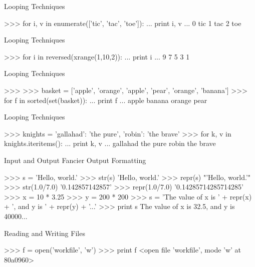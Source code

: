 \documentclass[11pt]{beamer}
\begin{document}
\begin{frame}[containsverbatim]{Looping Techniques}
\begin{python}
>>> for i, v in enumerate(['tic', 'tac', 'toe']):
...    print i, v
...
0 tic
1 tac
2 toe
\end{python}
\end{frame}

\begin{frame}[containsverbatim]{Looping Techniques}
\begin{python}
>>> for i in reversed(xrange(1,10,2)):
...    print i
...
9
7
5
3
1
\end{python}
\end{frame}

\begin{frame}[containsverbatim]{Looping Techniques}
\begin{python}
>>>
>>> basket = ['apple', 'orange', 'apple', 'pear', 'orange', 'banana']
>>> for f in sorted(set(basket)):
...    print f
...
apple
banana
orange
pear
\end{python}
\end{frame}

\begin{frame}[containsverbatim]{Looping Techniques}
\begin{python}
>>> knights = {'gallahad': 'the pure', 'robin': 'the brave'}
>>> for k, v in knights.iteritems():
...    print k, v
...
gallahad the pure
robin the brave
\end{python}
\end{frame}

\begin{frame}[containsverbatim]{Input and Output}
Fancier Output Formatting
\begin{python}
>>> s = 'Hello, world.'
>>> str(s)
'Hello, world.'
>>> repr(s)
"'Hello, world.'"
>>> str(1.0/7.0)
'0.142857142857'
>>> repr(1.0/7.0)
'0.14285714285714285'
>>> x = 10 * 3.25
>>> y = 200 * 200
>>> s = 'The value of x is ' + repr(x) + ', and y is ' + repr(y) + '...'
>>> print s
The value of x is 32.5, and y is 40000...

\end{python}
\end{frame}

\begin{frame}[containsverbatim]{Reading and Writing Files}
\begin{python}
>>> f = open('workfile', 'w')
>>> print f
<open file 'workfile', mode 'w' at 80a0960>
\end{python}
\end{frame}
\end{document}
